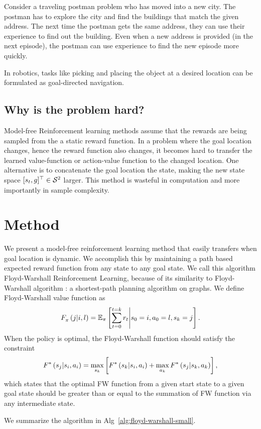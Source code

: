 Consider a traveling postman problem who has moved into a new city. The
postman has to explore the city and find the buildings that match the
given address.  The next time the postman gets the same address, they
can use their experience to find out the building.  Even when a new
address is provided (in the next episode), the postman can use
experience to find the new episode more quickly.

In robotics, tasks like picking and placing the object at a desired
location can be formulated as goal-directed navigation.

\subsection{Why is the problem hard?}
Model-free Reinforcement learning methods assume that the rewards are
being sampled from the a static reward function.  In a problem where the
goal location changes, hence the reward function also changes, it
becomes hard to transfer the learned value-function or action-value
function to the changed location.  One alternative is to concatenate the
goal location the state, making the new state space $[\state_t,
\goal]^\top \in \State^2$ larger.  This method is wasteful in
computation and more importantly in sample complexity.

\section{Method}
We present a model-free reinforcement learning method that easily
transfers when goal location is dynamic.  We accomplish this by
maintaining a path based expected reward function from any state to any
goal state.  We call this algorithm Floyd-Warshall Reinforcement
Learning, because of its similarity to Floyd-Warshall algorithm : a
shortest-path planning algorithm on graphs.  We define Floyd-Warshall
value function as
%
\begin{align}
\fwargs{i}{l}{j}{\policy}{} =
\E_{\policy}\left[ \sum_{t=0}^{t=k} \rew_t \middle\vert \state_0 = i, \act_0 = l, \state_k = j \right] .
\end{align}%
%
When the policy is optimal, the Floyd-Warshall function should satisfy the constraint
%
\begin{align}
\fwargs{\state_i}{\act_i}{\state_j}{}{*}
 = \max_{\state_k} \left[
\fwargs{\state_i}{\act_i}{\state_k}{}{*}
+ \max_{\act_k}\fwargs{\state_k}{\act_k}{\state_j}{}{*} \right] ,
\end{align}%
%
which states that the optimal FW function from a given start state to a
given goal state should be greater than or equal to the summation of FW
function via any intermediate state. 

We summarize the algorithm in Alg~\ref{alg:floyd-warshall-small}.





